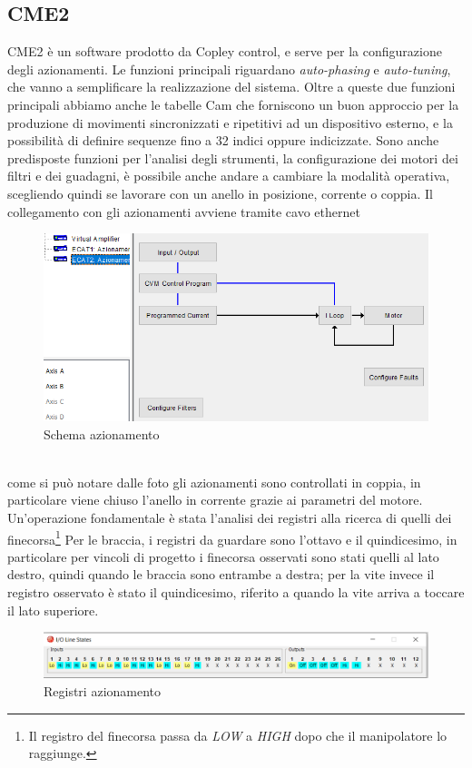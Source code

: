 \subsection{CME2}
CME2 è un software prodotto da Copley control, e serve per la configurazione degli azionamenti. Le funzioni principali riguardano \textit{auto-phasing} e \textit{auto-tuning}, che vanno a semplificare la realizzazione del sistema. Oltre a queste due funzioni principali abbiamo anche le tabelle Cam che forniscono un buon approccio per la produzione di movimenti sincronizzati e ripetitivi ad un dispositivo esterno, e la possibilità di definire sequenze fino a 32 indici oppure indicizzate. Sono anche predisposte funzioni per l'analisi degli strumenti, la configurazione dei motori dei filtri e dei guadagni, è possibile anche andare a cambiare la modalità operativa, scegliendo quindi se lavorare con un anello in posizione, corrente o coppia. Il collegamento con gli azionamenti avviene tramite cavo ethernet
\begin{figure}[ht]
\begin{center}
    \includegraphics[scale=0.8]{Immagini/Sperimentale/azionamenti.PNG}
    \caption{Schema azionamento}
\end{center}
\end{figure}
\\come si può notare dalle foto gli azionamenti sono controllati in coppia, in particolare viene chiuso l'anello in corrente grazie ai parametri del motore. Un'operazione fondamentale è stata l'analisi dei registri alla ricerca di quelli dei finecorsa\footnote{Il registro del finecorsa passa da \textit{LOW} a \textit{HIGH} dopo che il manipolatore lo raggiunge.}
Per le braccia, i registri da guardare sono l'ottavo e il quindicesimo, in particolare per vincoli di progetto i finecorsa osservati sono stati quelli al lato destro, quindi quando le braccia sono entrambe a destra; per la vite invece il registro osservato è stato il quindicesimo, riferito a quando la vite arriva a toccare il lato superiore.
\begin{figure}[ht]
\begin{center}
    \includegraphics[scale=0.6]{Immagini/Sperimentale/registri.PNG}
    \caption{Registri azionamento}
\end{center}
\end{figure}
